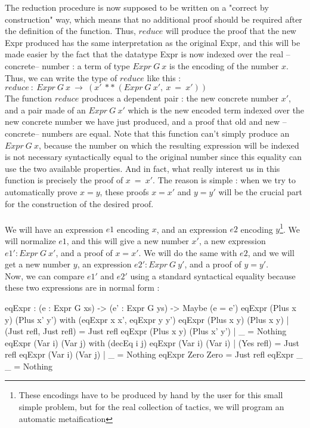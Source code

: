 \documentclass{sigplanconf}
\begin{document}
The reduction procedure is now supposed to be written on a "correct by construction" way, which means that no additional proof should be required after the definition of the function. Thus, $reduce$ will produce the proof that the new Expr produced has the same interpretation as the original Expr, and this will be made easier by the fact that the datatype Expr is now indexed over the real --concrete-- number : a term of type $Expr\ G\ x$ is the encoding of the number $x$.
Thus, we can write the type of $reduce$ like this : \\
$reduce\ :\ Expr\ G\ x\ \rightarrow\ (x'\ **\ (Expr\ G\ x',\ x\ =\ x'))$ \\
The function $reduce$ produces a dependent pair : the new concrete number $x'$, and a pair made of an $Expr\ G\ x'$ which is the new encoded term indexed over the new concrete number we have just produced, and a proof that old and new --concrete-- numbers are equal.
Note that this function can't simply produce an $Expr\ G\ x$, because the number on which the resulting expression will be indexed is not necessary syntactically equal to the original number since this equality can use the two available properties. 
And in fact, what really interest us in this function is precisely the proof of $x\ =\ x'$.
The reason is simple : when we try to automatically prove $x=y$, these proofs $x=x'$ and $y=y'$ will be the crucial part for the construction of the desired proof. \\
\\
We will have an expression $e1$ encoding $x$, and an expression $e2$ encoding $y$\footnote{These encodings have to be produced by hand by the user for this small simple problem, but for the real collection of tactics, we will program an automatic metaification}.
We will normalize $e1$, and this will give a new number $x'$, a new expression $e1':Expr\ G\ x'$, and a proof of $x=x'$. We will do the same with $e2$, and we will get a new number $y$, an expression $e2':Expr\ G\ y'$, and a proof of $y=y'$. \\
Now, we can compare $e1'$ and $e2'$ using a standard syntactical equality because these two expressions are in normal form :

\begin{code}[caption=Syntactical equality between reflected terms, captionpos=b, label=lst1:haskell2]
eqExpr : (e : Expr G xs) -> (e' : Expr G ys) 
         -> Maybe (e = e')
eqExpr (Plus x y) (Plus x' y') 
        with (eqExpr x x', eqExpr y y')
  eqExpr (Plus x y) (Plus x y) 
        | (Just refl, Just refl) = Just refl
  eqExpr (Plus x y) (Plus x' y') 
        | _ = Nothing
eqExpr (Var i) (Var j) with (decEq i j)
  eqExpr (Var i) (Var i) 
        | (Yes refl) = Just refl
  eqExpr (Var i) (Var j) 
        | _ = Nothing
eqExpr Zero Zero = Just refl
eqExpr _ _ = Nothing
\end{code}
\end{document}

